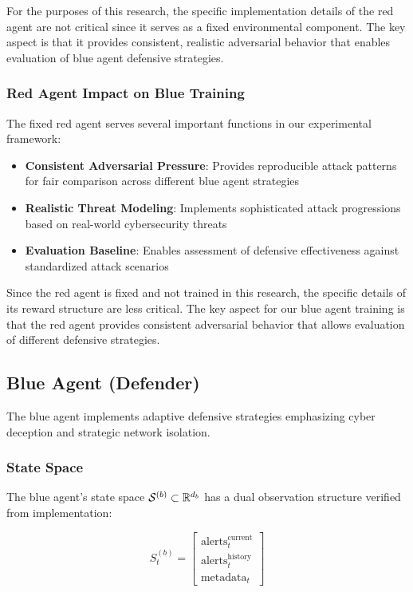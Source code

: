 \documentclass[12pt,twoside]{article}
\begin{document}
For the purposes of this research, the specific implementation details of the red agent are not critical since it serves as a fixed environmental component. The key aspect is that it provides consistent, realistic adversarial behavior that enables evaluation of blue agent defensive strategies.

\subsubsection{Red Agent Impact on Blue Training}
The fixed red agent serves several important functions in our experimental framework:
\begin{itemize}
\item \textbf{Consistent Adversarial Pressure}: Provides reproducible attack patterns for fair comparison across different blue agent strategies
\item \textbf{Realistic Threat Modeling}: Implements sophisticated attack progressions based on real-world cybersecurity threats
\item \textbf{Evaluation Baseline}: Enables assessment of defensive effectiveness against standardized attack scenarios
\end{itemize}

Since the red agent is fixed and not trained in this research, the specific details of its reward structure are less critical. The key aspect for our blue agent training is that the red agent provides consistent adversarial behavior that allows evaluation of different defensive strategies.

\subsection{Blue Agent (Defender)}

The blue agent implements adaptive defensive strategies emphasizing cyber deception and strategic network isolation.

\subsubsection{State Space}
The blue agent's state space $\mathcal{S}^{(b)} \subset \mathbb{R}^{d_b}$ has a dual observation structure verified from implementation:

\begin{equation}
S_t^{(b)} = \begin{bmatrix}
\text{alerts}_t^{\text{current}} \\
\text{alerts}_t^{\text{history}} \\
\text{metadata}_t
\end{bmatrix}
\end{equation}
\end{document}
